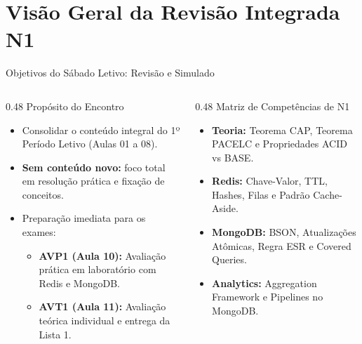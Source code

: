 \section[Visão Geral da Revisão N1]{Visão Geral da Revisão Integrada N1}

\begin{frame}{Objetivos do Sábado Letivo: Revisão e Simulado}
  \vspace{0.1cm}
  \begin{columns}[t,onlytextwidth]
    \begin{column}{0.48\textwidth}
      \alert{Propósito do Encontro}\par
      \footnotesize
      \begin{itemize}
        \item Consolidar o conteúdo integral do 1º Período Letivo (Aulas 01 a 08).
        \item \textbf{Sem conteúdo novo:} foco total em resolução prática e fixação de conceitos.
        \item Preparação imediata para os exames:
          \begin{itemize}
            \item \textbf{AVP1 (Aula 10):} Avaliação prática em laboratório com Redis e MongoDB.
            \item \textbf{AVT1 (Aula 11):} Avaliação teórica individual e entrega da Lista 1.
          \end{itemize}
      \end{itemize}
    \end{column}
    \begin{column}{0.48\textwidth}
      \alert{Matriz de Competências de N1}\par
      \footnotesize
      \begin{itemize}
        \item \textbf{Teoria:} Teorema CAP, Teorema PACELC e Propriedades ACID vs BASE.
        \item \textbf{Redis:} Chave-Valor, TTL, Hashes, Filas e Padrão Cache-Aside.
        \item \textbf{MongoDB:} BSON, Atualizações Atômicas, Regra ESR e Covered Queries.
        \item \textbf{Analytics:} Aggregation Framework e Pipelines no MongoDB.
      \end{itemize}
    \end{column}
  \end{columns}
\end{frame}

